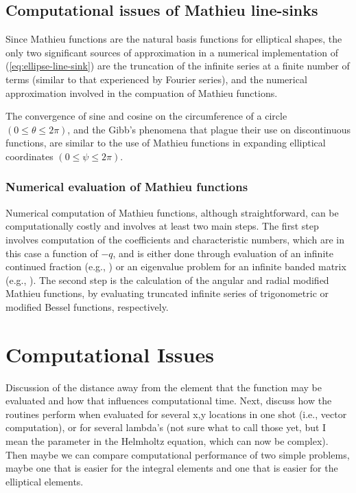 \documentclass{elsart}
\begin{document}
\subsection{Computational issues of Mathieu line-sinks}
Since Mathieu functions are the natural basis functions for elliptical shapes, the only two significant sources of approximation in a numerical implementation of (\ref{eq:ellipse-line-sink}) are the truncation of the infinite series at a finite number of terms (similar to that experienced by Fourier series), and the numerical approximation involved in the compuation of Mathieu functions.  

The convergence of sine and cosine on the circumference of a circle $(0 \le \theta \le 2 \pi)$, and the Gibb's phenomena that plague their use on discontinuous functions, are similar to the use of Mathieu functions in expanding  elliptical coordinates $(0 \le \psi \le 2 \pi)$.

\subsubsection{Numerical evaluation of Mathieu functions}
Numerical computation of Mathieu functions, although straightforward, can be computationally costly and involves at least two main steps.  The first step involves computation of the coefficients and characteristic numbers, which are in this case a function of $-q$, and is either done through evaluation of an infinite continued fraction (e.g., \cite{blanch1966numerical,alhargan2000}) or an eigenvalue problem for an infinite banded matrix (e.g., \cite{delft73,stamnes1995new}). The second step is the calculation of the angular and radial modified Mathieu functions, by evaluating truncated infinite series of trigonometric or modified Bessel functions, respectively.

\section{Computational Issues}
Discussion of the distance away from the element that the function may be evaluated and how that influences computational time. Next, discuss how the routines perform when evaluated for several x,y locations in one shot (i.e., vector computation), or for several lambda's (not sure what to call those yet, but I mean the parameter in the Helmholtz equation, which can now be complex).  Then maybe we can compare computational performance of two simple problems, maybe one that is easier for the integral elements and one that is easier for the elliptical elements.
\end{document}
